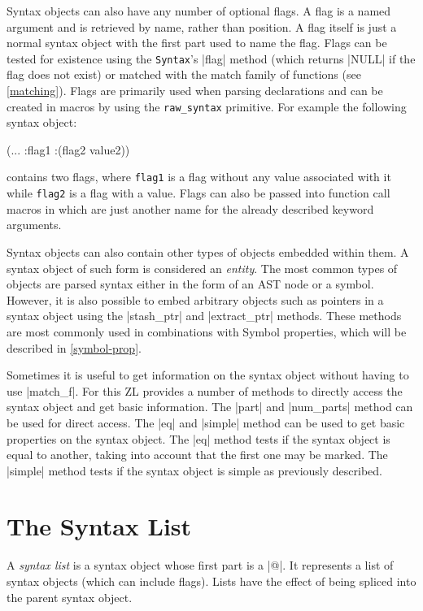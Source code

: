 \label{syntax-flags}
Syntax objects can also have any number of optional flags.  A flag is a
named argument and is retrieved by name, rather than position.  A flag
itself is just a normal syntax object with the first part used to name
the flag.  Flags can be tested for existence using the \verb/Syntax/'s
|flag| method (which returns |NULL| if the flag does not exist) or
matched with the match family of functions (see \ref{matching}).
Flags are primarily used when parsing declarations and can be created in
macros by using the \verb/raw_syntax/ primitive.  For example the
following syntax object:
\begin{code}
(... :flag1 :(flag2 value2))
\end{code}
contains two flags, where \verb/flag1/ is a flag without any value
associated with it while \verb/flag2/ is a flag with a value.  Flags
can also be passed into function call macros in which are just another
name for the already described keyword arguments.

Syntax objects can also contain other types of objects embedded within
them.  A syntax object of such form is considered an \textit{entity}.
The most common types of objects are parsed syntax either in the form
of an AST node or a symbol.  However, it is also possible to embed
arbitrary objects such as pointers in a syntax object using the
|stash_ptr| and |extract_ptr| methods.  These methods are most
commonly used in combinations with Symbol properties, which will be
described in \ref{symbol-prop}.

Sometimes it is useful to get information on the syntax object
without having to use |match_f|.  For this ZL provides a number of
methods to directly access the syntax object and get basic
information.  The |part| and |num_parts| method can be used for direct
access.  The |eq| and |simple| method can be used to get basic
properties on the syntax object.  The |eq| method tests if the syntax
object is equal to another, taking into account that the first one may
be marked.  The |simple| method tests if the syntax object is simple
as previously described.

\section{The Syntax List}
\label{SyntaxList}

A \textit{syntax list} is a syntax object whose first part is a |@|.
It represents a list of syntax objects (which can include flags).
Lists have the effect of being spliced into the parent syntax object.

